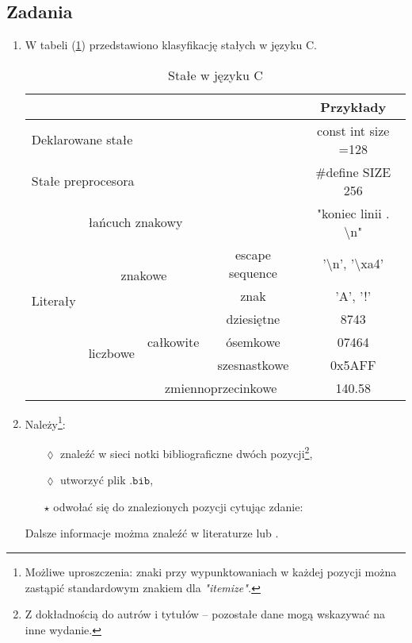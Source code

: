 \documentclass[a4paper, 11pt]{article}
\begin{document}
\subsection{Zadania}
\begin{enumerate}
\item {W tabeli (\ref{tab}) przedstawiono klasyfikację stałych w języku C.

\begin{table}[!h]
\caption{Stałe w języku C}
\label{tab}
\begin{center}
\begin{tabular}{|c|c|c|c|c|}

\cline{5-5}
\multicolumn{4}{l|}{}&Przykłady \\
\hline
\multicolumn{4}{|l|}{Deklarowane stałe} & const int size =128 \\
\hline
\multicolumn{4}{|l|}{Stałe preprocesora} & \#define SIZE 256 \\
\hline
\multirow{7}{*}{Literały} & \multicolumn{3}{|l|}{łańcuch znakowy} & "koniec linii . \textbackslash n" \\

 \cline{2-5}& \multicolumn{2}{c|}{\multirow{2}{*}{znakowe}} & escape sequence & '\textbackslash n', '\textbackslash xa4'\\
\cline{4-5} &&& znak & 'A', '!'\\  

\cline{2-5}&\multirow{4}{*}{liczbowe}&\multirow{3}{*}{całkowite}& dziesiętne & 8743 \\
\cline{4-5}&&&ósemkowe&07464 \\
\cline{4-5}&&&szesnastkowe&0x5AFF \\
\cline{3-5}&&\multicolumn{2}{|c|}{zmiennoprzecinkowe}& 140.58\\

\hline
\end{tabular}
\end{center}
\end{table}

}
\item {Należy\footnote{Możliwe uproszczenia: znaki przy wypunktowaniach w każdej pozycji można zastąpić standardowym znakiem dla {\em"itemize".}}:

\begin{itemize}
\item[$\lozenge$] {znaleźć w sieci notki bibliograficzne dwóch pozycji\footnote{Z dokładnością do autrów i tytułów -- pozostałe dane mogą wskazywać na inne wydanie.},
}
\item[$\lozenge$] {utworzyć plik $\mathtt{.bib}$,}
\item[$\star$] {
odwołać się do znalezionych pozycji cytując zdanie:
}
\end{itemize}
{\centering Dalsze informacje możma znaleźć w literaturze \cite{kahneman2011thinking} lub \cite{kernighan2006c}.}
}
\end{enumerate}


\end{document}
